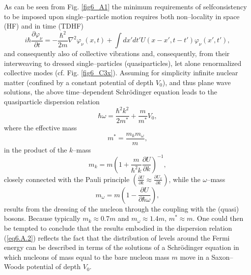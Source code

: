 As can be seen from Fig. \ref{fig6_A1} the minimum requirements of selfconsistency to be imposed upon single--particle motion requires both non--locality in space (HF) and in time (TDHF)
\begin{equation}\label{eq6.A.1}
i\hbar \frac{\partial \varphi_\nu}{\partial t}=-\frac{\hbar^2}{2 m}\nabla^2 \varphi_\nu(x,t)+\int dx'dt'U(x-x',t-t')\varphi_\nu(x',t'),
\end{equation}
and consequently also of collective vibrations and, consequently, from their interweaving to dressed single--particles (quasiparticles), let alone renormalized collective modes (cf. Fig. \ref{fig6_C3x}). Assuming for simplicity infinite nuclear matter (confined by a constant potential of depth $V_0$), and thus plane wave solutions, the above time--dependent Schr\"{o}dinger equation leads to the quasiparticle dispersion relation 
\begin{equation}\label{eq6.A.2}
\hbar\omega=\frac{\hbar^2k^2}{2m^*}+\frac{m}{m^*}V_0,
\end{equation}
where the effective mass
\begin{equation}\label{eq4.A.3}
m^*=\frac{m_k m_\omega}{m},
\end{equation}
in the product of the $k$--mass
\begin{equation}
m_k=m\left(1+\frac{m}{\hbar^2k}\frac{\partial U}{\partial k}\right)^{-1},
\end{equation}
closely connected with the Pauli principle $\left(\frac{\partial U}{\partial k}\approx \frac{\partial U_x}{\partial k}\right)$, while the $\omega$--mass
\begin{equation}\label{eq6A5}
m_\omega=m\left(1-\frac{\partial U}{\partial \hbar \omega}\right),
\end{equation}
results from the dressing of the nucleon through the coupling with the (quasi) bosons. Because typically $m_k\approx 0.7 m$ and $m_\omega \approx 1.4 m$, $m^*\approx m$. One could then be tempted to conclude that the results embodied in the dispersion relation (\ref{eq6.A.2}) reflects the fact that the distribution of levels around the Fermi energy can be described in terms of the solutions of a Schr\"{o}dinger equation in which nucleons of mass equal to the bare nucleon mass $m$ move in a Saxon--Woods potential of depth $V_0$.
